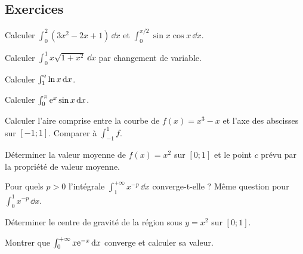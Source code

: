 \subsection{Exercices}
\begin{exo}[A]\label{c4e1}
Calculer $\int_0^2(3x^2-2x+1)\,\dd x$ et $\int_0^{\pi/2}\sin x\cos x\,\dd x$.
\end{exo}
\begin{exo}[A]\label{c4e2}
Calculer $\int_0^1x\sqrt{1+x^2}\,\dd x$ par changement de variable.
\end{exo}
\begin{exo}[A]\label{c4e3}
Calculer $\int_1^{\mathrm{e}}\ln x\,\mathrm{d} x$.
\end{exo}
\begin{exo}[B]\label{c4e4}
Calculer $\int_0^\pi\mathrm{e}^x\sin x\,\mathrm{d} x$.
\end{exo}
\begin{exo}[B]\label{c4e5}
Calculer l'aire comprise entre la courbe de $f(x)=x^3-x$ et l'axe des abscisses sur $[-1;1]$. Comparer à $\int_{-1}^1f$.
\end{exo}
\begin{exo}[B]\label{c4e6}
Déterminer la valeur moyenne de $f(x)=x^2$ sur $[0;1]$ et le point $c$ prévu par la propriété de valeur moyenne.
\end{exo}
\begin{exo}[C]\label{c4e7}
Pour quels $p>0$ l'intégrale $\int_1^{+\infty}x^{-p}\,\dd x$ converge-t-elle ? Même question pour $\int_0^1x^{-p}\,\dd x$.
\end{exo}
\begin{exo}[C]\label{c4e8}
Déterminer le centre de gravité de la région sous $y=x^2$ sur $[0;1]$.
\end{exo}
\begin{exo}[C]\label{c4e9}
Montrer que $\int_0^{+\infty}x\mathrm{e}^{-x}\,\mathrm{d} x$ converge et calculer sa valeur.
\end{exo}

\ifcorr
